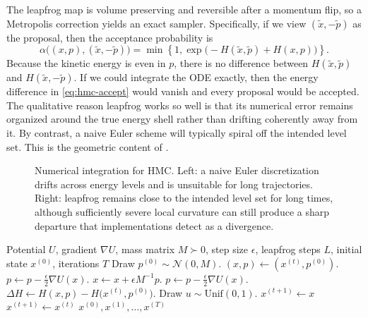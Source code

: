 The leapfrog map is volume preserving and reversible after a momentum flip, so a Metropolis correction yields an exact sampler.
Specifically, if we view $(\tilde x,-\tilde p)$ as the proposal, then the acceptance probability is
\begin{equation}
  \alpha\bigl((x,p),(\tilde x,-\tilde p)\bigr)
  =
  \min\!\left\{1,\exp\!\bigl(-H(\tilde x,\tilde p)+H(x,p)\bigr)\right\}.
  \label{eq:hmc-accept}
\end{equation}
Because the kinetic energy is even in $p$, there is no difference between $H(\tilde x,\tilde p)$ and $H(\tilde x,-\tilde p)$.
If we could integrate the ODE exactly, then the energy difference in \eqref{eq:hmc-accept} would vanish and every proposal would be accepted.
The qualitative reason leapfrog works so well is that its numerical error remains organized around the true energy shell rather than drifting coherently away from it.
By contrast, a naive Euler scheme will typically spiral off the intended level set.
This is the geometric content of .

\begin{figure}[H]
  \centering
  
  \caption{Numerical integration for HMC.
  Left: a naive Euler discretization drifts across energy levels and is unsuitable for long trajectories.
  Right: leapfrog remains close to the intended level set for long times, although sufficiently severe local curvature can still produce a sharp departure that implementations detect as a divergence.}
  \label{fig:hmc-integration-stability}
\end{figure}

\begin{algorithm}[H]
  \caption{Hamiltonian Monte Carlo}
  \label{alg:hmc}
  \begin{algorithmic}[1]
    \Require Potential $U$, gradient $\nabla U$, mass matrix $M\succ 0$, step size $\epsilon$, leapfrog steps $L$, initial state $x^{(0)}$, iterations $T$
      \State Draw $p^{(0)} \sim \mathcal{N}(0,M)$.
      \State $(x,p) \gets (x^{(t)},p^{(0)})$.
        \State $p \gets p - \frac{\epsilon}{2}\nabla U(x)$.
        \State $x \gets x + \epsilon M^{-1}p$.
        \State $p \gets p - \frac{\epsilon}{2}\nabla U(x)$.
      \EndFor
      \State $\Delta H \gets H(x,p) - H\bigl(x^{(t)},p^{(0)}\bigr)$.
      \State Draw $u \sim \mathrm{Unif}(0,1)$.
        \State $x^{(t+1)} \gets x$
      \Else
        \State $x^{(t+1)} \gets x^{(t)}$
      \EndIf
    \EndFor
    \State \Return $x^{(0)},x^{(1)},\dots,x^{(T)}$
  \end{algorithmic}
\end{algorithm}

